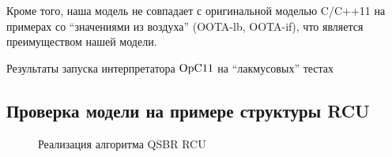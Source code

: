 Кроме того, наша модель не совпадает с оригинальной моделью C/C++11 на примерах со ``значениями из воздуха''
(\textsf{OOTA-lb}, \textsf{OOTA-if}), что является преимуществом нашей модели.


\begin{table}
\centering
{\scriptsize
 
}
\caption{Результаты запуска интерпретатора $\mathrm{OpC11}$ на ``лакмусовых'' тестах}
\label{fig:litmusTbl}
\end{table}


\subsection{Проверка модели на примере структуры RCU}
\label{sec:opc11:rcu}

\begin{figure*}

\caption[Реализация алгоритма QSBR RCU]
{Реализация алгоритма QSBR RCU}
\label{fig:rcuProg} \end{figure*}

